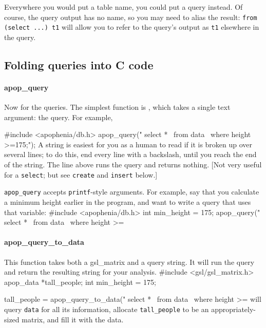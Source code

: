Everywhere you would put a table name, you could put a query 
instead. Of course, the query output has no name, so you may need to
alias the result: {\tt from (select ...) t1} will allow you to refer to
the query's output as {\tt t1} elsewhere in the query.

\subsection{Folding queries into C code} 


\paragraph{apop\_query} Now for the queries. The simplest function
is , which takes a single text argument: the
query. For example,

#include <apophenia/db.h>
apop_query(" select *        \
               from data     \
                  where height >=175;");
A string is easiest for you as a human to read if it is
broken up over several lines; to do this, end every line with a
backslash, until you reach the end of the string. The line above runs
the query and returns nothing. [Not very useful for a {\tt select}; but see
{\tt create} and  {\tt insert} below.]

{\tt apop\_query} accepts {\tt printf}-style arguments. For example,
say that you calculate a minimum height earlier in the program, and want
to write a query that uses that variable:
#include <apophenia/db.h>
int min_height	= 175;
apop_query(" select *     \
               from data     \
               where height >=%

\paragraph{apop\_query\_to\_data} 
This function takes both a gsl\_matrix and a query string. It will run
the query and return the resulting string for your analysis.  
#include <gsl/gsl_matrix.h>
apop_data *tall_people;
int min_height	= 175;

tall_people = apop_query_to_data(" select *     \
                                   from data     \
                                   where height >=%
will query {\tt data} for all its information, allocate {\tt tall\_people} to be an
ap\-prop\-ri\-ate\-ly-sized matrix, and fill it with the data.

